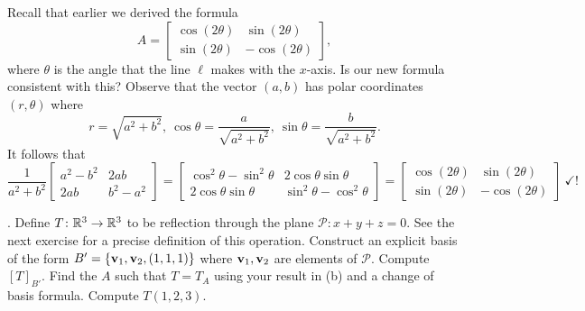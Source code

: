 \begin{solution}
\[\]
Recall that earlier we derived the formula 
\[
A=\begin{bmatrix}
\cos(2\theta) &\sin(2\theta)\\
\sin(2\theta)&-\cos(2\theta)
\end{bmatrix},
\]
where $\theta$ is the angle that the line $\ell$ makes with the $x$-axis. Is our new formula consistent with this? Observe that the vector $(a,b)$ has polar coordinates $(r,\theta)$ where 
\[
r=\sqrt{a^2+b^2}, \ \cos\theta=\frac{a}{\sqrt{a^2+b^2}},\  \sin\theta=\frac{b}{\sqrt{a^2+b^2}}.
\]
It follows that 
\[
\frac{1}{a^2+b^2}\begin{bmatrix}
a^2-b^2&2ab\\
2ab&b^2-a^2
\end{bmatrix}=
\begin{bmatrix}
\cos^2\theta-\sin^2\theta&2\cos\theta\sin\theta\\
2\cos\theta\sin\theta&\sin^2\theta-\cos^2\theta
\end{bmatrix}
=\begin{bmatrix}
\cos(2\theta) &\sin(2\theta)\\
\sin(2\theta)&-\cos(2\theta)
\end{bmatrix} \ \checkmark !
\]

\end{solution}
. Define $T\colon {\mathbb R}^3\rightarrow {\mathbb R}^3$ to be reflection through the plane $\mathcal{P}\colon x+y+z=0$. See the next exercise for a precise definition of this operation. 
\bb
\ii Construct an explicit basis of the form $B'=\{{\mathbf v}_1,{\mathbf v}_2, (1,1,1)\}$ where ${\mathbf v}_1,{\mathbf v}_2$ are elements of $\mathcal{P}$. 
\ii Compute $[T]_{B'}$. 
\ii Find the $A$ such that $T=T_A$ using your result in (b) and a change of basis formula. 
\ii Compute $T(1,2,3)$. 
\ee
